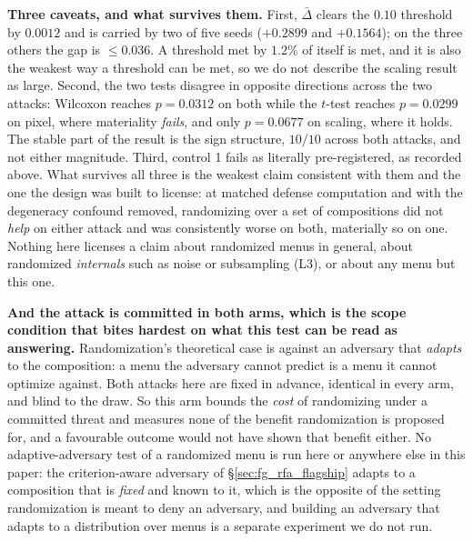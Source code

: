 \documentclass{article}
\begin{document}
\textbf{Three caveats, and what survives them.} First, $\bar{\Delta}$ clears the $0.10$ threshold by
$0.0012$ and is carried by two of five seeds ($+0.2899$ and $+0.1564$); on the three others the gap is
$\leq 0.036$. A threshold met by $1.2\%$ of itself is met, and it is also the weakest way a threshold can
be met, so we do not describe the scaling result as large. Second, the two tests disagree in opposite
directions across the two attacks: Wilcoxon reaches $p=0.0312$ on both while the $t$-test reaches
$p=0.0299$ on pixel, where materiality \emph{fails}, and only $p=0.0677$ on scaling, where it holds. The
stable part of the result is the sign structure, $10/10$ across both attacks, and not either magnitude.
Third, control 1 fails as literally pre-registered, as recorded above. What survives all three is the
weakest claim consistent with them and the one the design was built to license: at matched defense
computation and with the degeneracy confound removed, randomizing over a set of compositions did not
\emph{help} on either attack and was consistently worse on both, materially so on one. Nothing here
licenses a claim about randomized menus in general, about randomized \emph{internals} such as noise or
subsampling (L3), or about any menu but this one.

\textbf{And the attack is committed in both arms, which is the scope condition that bites hardest on what
this test can be read as answering.} Randomization's theoretical case is against an adversary that
\emph{adapts} to the composition: a menu the adversary cannot predict is a menu it cannot optimize against.
Both attacks here are fixed in advance, identical in every arm, and blind to the draw. So this arm bounds
the \emph{cost} of randomizing under a committed threat and measures none of the benefit randomization is
proposed for, and a favourable outcome would not have shown that benefit either. No adaptive-adversary test
of a randomized menu is run here or anywhere else in this paper: the criterion-aware adversary of
§\ref{sec:fg_rfa_flagship} adapts to a composition that is \emph{fixed} and known to it, which is the
opposite of the setting randomization is meant to deny an adversary, and building an adversary that adapts
to a distribution over menus is a separate experiment we do not run.


\end{document}
